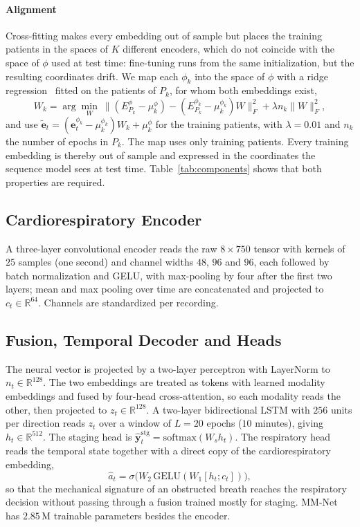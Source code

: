 \documentclass{ieeeaccess}
\begin{document}
\paragraph{Alignment} Cross-fitting makes every embedding out of sample but places the
training patients in the spaces of $K$ different encoders, which do not coincide with the
space of $\phi$ used at test time: fine-tuning runs from the same initialization, but the
resulting coordinates drift. We map each $\phi_k$ into the space of $\phi$ with a ridge
regression~\cite{hoerl1970ridge} fitted on the patients of $P_k$, for whom both embeddings exist,
\begin{equation}
W_k=\arg\min_W\ \big\lVert(E^{\phi}_{P_k}-\mu^{\phi}_k)-(E^{\phi_k}_{P_k}-\mu^{\phi_k}_k)W\big\rVert_F^2
+\lambda n_k\lVert W\rVert_F^2,
\end{equation}
and use $\tilde{\mathbf{e}}_t=(\mathbf{e}^{\phi_k}_t-\mu^{\phi_k}_k)W_k+\mu^{\phi}_k$ for the
training patients, with $\lambda=0.01$ and $n_k$ the number of epochs in $P_k$. The map uses
only training patients. Every training embedding is thereby out of sample and expressed in the
coordinates the sequence model sees at test time. Table~\ref{tab:components} shows that both
properties are required.

\subsection{Cardiorespiratory Encoder}
A three-layer convolutional encoder reads the raw $8\times750$ tensor with kernels of $25$
samples (one second) and channel widths $48$, $96$ and $96$, each followed by batch
normalization and GELU, with max-pooling by four after the first two layers; mean and max
pooling over time are concatenated and projected to $c_t\in\mathbb{R}^{64}$. Channels are
standardized per recording.

\subsection{Fusion, Temporal Decoder and Heads}
The neural vector is projected by a two-layer perceptron with LayerNorm to $n_t\in\mathbb{R}^{128}$.
The two embeddings are treated as tokens with learned modality embeddings and fused by four-head
cross-attention, so each modality reads the other, then projected to $z_t\in\mathbb{R}^{128}$.
A two-layer bidirectional LSTM with $256$ units per direction reads $z_t$ over a window of
$L=20$ epochs ($10$ minutes), giving $h_t\in\mathbb{R}^{512}$. The staging head is
$\hat{\mathbf{y}}^{\mathrm{stg}}_t=\mathrm{softmax}(W_s h_t)$. The respiratory head reads the
temporal state together with a direct copy of the cardiorespiratory embedding,
\begin{equation}
\hat a_t=\sigma\big(W_2\,\mathrm{GELU}(W_1[h_t;c_t])\big),
\end{equation}
so that the mechanical signature of an obstructed breath reaches the respiratory decision
without passing through a fusion trained mostly for staging. MM-Net has $2.85$\,M trainable
parameters besides the encoder.
\end{document}

